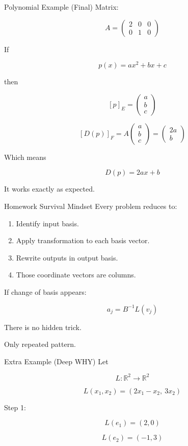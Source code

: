 \documentclass[aspectratio=169]{beamer}
\begin{document}
\begin{frame}{Polynomial Example (Final)}
Matrix:

\[
A =
\begin{pmatrix}
2 & 0 & 0\\
0 & 1 & 0
\end{pmatrix}
\]

If

\[
p(x)=ax^2+bx+c
\]

then

\[
[p]_E =
\begin{pmatrix}
a\\b\\c
\end{pmatrix}
\]

\[
[D(p)]_F =
A
\begin{pmatrix}
a\\b\\c
\end{pmatrix}
=
\begin{pmatrix}
2a\\b
\end{pmatrix}
\]

Which means

\[
D(p)=2ax+b
\]

It works exactly as expected.
\end{frame}

\begin{frame}{Homework Survival Mindset}
Every problem reduces to:

\begin{enumerate}
\item Identify input basis.
\item Apply transformation to each basis vector.
\item Rewrite outputs in output basis.
\item Those coordinate vectors are columns.
\end{enumerate}

If change of basis appears:

\[
a_j = B^{-1}L(v_j)
\]

\bigskip

There is no hidden trick.

Only repeated pattern.
\end{frame}

\begin{frame}{Extra Example (Deep WHY)}
Let

\[
L: \mathbb{R}^2 \to \mathbb{R}^2
\]

\[
L(x_1,x_2) = (2x_1 - x_2,\ 3x_2)
\]

Step 1:

\[
L(e_1)=(2,0)
\]

\[
L(e_2)=(-1,3)
\]

\end{frame}
\end{document}
